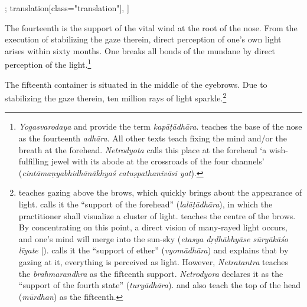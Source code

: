 \begin{alignment}[
  texts=edition[class="edition"];
  translation[class="translation"],
  ]
\begin{translation}
\begin{tlate}[p30_05]
      The fourteenth is the support of the vital wind at the root of the nose. From the execution of stabilizing the gaze therein, direct perception of one's own light arises within sixty months. One breaks all bonds of the mundane by direct perception of the light.\footnote{\textit{Yogasvarodaya} and  provide the term \textit{kapāṭādhāra}.  teaches the base of the nose as the fourteenth \textit{adhāra}. All other texts teach fixing the mind and/or the breath at the forehead. \textit{Netrodyota} calls this place at the forehead `a wish-fulfilling jewel with its abode at the crossroads of the four channels' (\textit{cintāmaṇyabhidhānākhyaś catuṣpathanivāsi yat}).}     
            
      The fifteenth container is situated in the middle of the eyebrows. Due to stabilizing the gaze therein, ten million rays of light sparkle.\footnote{ teaches gazing above the brows, which quickly brings about the appearance of light.  calls it the ``support of the forehead'' (\textit{lalāṭādhāra}), in which the practitioner shall visualize a cluster of light.  teaches the centre of the brows. By concentrating on this point, a direct vision of many-rayed light occurs, and one's mind will merge into the sun-sky (\textit{etasya dṛḍhābhyāse sūryākāśo līyate} |).  calls it the ``support of ether'' (\textit{vyomādhāra}) and explains that by gazing at it, everything is perceived as light. However, \textit{Netratantra} teaches the \textit{brahmarandhra} as the fifteenth support. \textit{Netrodyora} declares it as the ``support of the fourth state'' (\textit{turyādhāra}).  and  also teach the top of the head (\textit{mūrdhan}) as the fifteenth.}
      

\end{tlate}
\end{translation}
\end{alignment}
